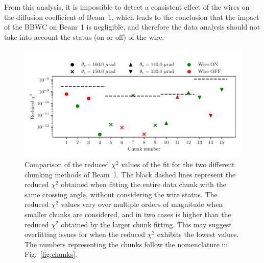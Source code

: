 From this analysis, it is impossible to detect a consistent effect of the wires on the diffusion coefficient of Beam~1, which leads to the conclusion that the impact of the BBWC on Beam~1 is negligible, and therefore the data analysis should not take into account the status (on or off) of the wire.

\begin{figure}[th]
    \centering
    \includegraphics[width=1.0\textwidth]{5_wire_compensators_LHC/figs/chi_comparison.pdf}
    \caption{Comparison of the reduced $\chi^2$ values of the fit for the two different chunking methods of Beam~1. The black dashed lines represent the reduced $\chi^2$ obtained when fitting the entire data chunk with the same crossing angle, without considering the wire status. The reduced $\chi^2$ values vary over multiple orders of magnitude when smaller chunks are considered, and in two cases is higher than the reduced $\chi^2$ obtained by the larger chunk fitting. This may suggest overfitting issues for when the reduced $\chi^2$ exhibits the lowest values. The numbers representing the chunks follow the nomenclature in Fig.~\ref{fig:chunks}.}
    \label{fig:chi2}
\end{figure}

